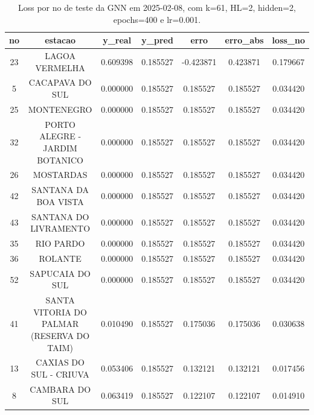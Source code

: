 \begin{table}[h]
\centering
\caption{Loss por no de teste da GNN em 2025-02-08, com k=61, HL=2, hidden=2, epochs=400 e lr=0.001.}
\label{tab:gnn_loss_k61_hl2_h2_e400_d20250208}
\begin{tabular}{ccccccc}
\toprule
no & estacao & y\_real & y\_pred & erro & erro\_abs & loss\_no \\
\midrule
23 & LAGOA VERMELHA & 0.609398 & 0.185527 & -0.423871 & 0.423871 & 0.179667 \\
5 & CACAPAVA DO SUL & 0.000000 & 0.185527 & 0.185527 & 0.185527 & 0.034420 \\
25 & MONTENEGRO & 0.000000 & 0.185527 & 0.185527 & 0.185527 & 0.034420 \\
32 & PORTO ALEGRE - JARDIM BOTANICO & 0.000000 & 0.185527 & 0.185527 & 0.185527 & 0.034420 \\
26 & MOSTARDAS & 0.000000 & 0.185527 & 0.185527 & 0.185527 & 0.034420 \\
42 & SANTANA DA BOA VISTA & 0.000000 & 0.185527 & 0.185527 & 0.185527 & 0.034420 \\
43 & SANTANA DO LIVRAMENTO & 0.000000 & 0.185527 & 0.185527 & 0.185527 & 0.034420 \\
35 & RIO PARDO & 0.000000 & 0.185527 & 0.185527 & 0.185527 & 0.034420 \\
36 & ROLANTE & 0.000000 & 0.185527 & 0.185527 & 0.185527 & 0.034420 \\
52 & SAPUCAIA DO SUL & 0.000000 & 0.185527 & 0.185527 & 0.185527 & 0.034420 \\
41 & SANTA VITORIA DO PALMAR (RESERVA DO TAIM) & 0.010490 & 0.185527 & 0.175036 & 0.175036 & 0.030638 \\
13 & CAXIAS DO SUL - CRIUVA & 0.053406 & 0.185527 & 0.132121 & 0.132121 & 0.017456 \\
8 & CAMBARA DO SUL & 0.063419 & 0.185527 & 0.122107 & 0.122107 & 0.014910 \\
\bottomrule
\end{tabular}
\end{table}
